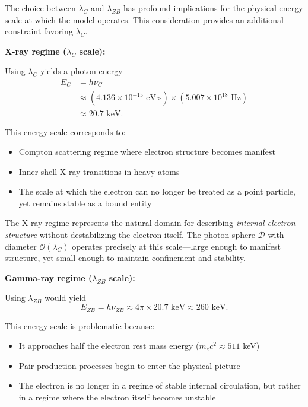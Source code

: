 \documentclass[%
 reprint,
 amsmath,amssymb,
 aps,
 prb,
]{revtex4-2}
\numberwithin{equation}{section}
\begin{document}
The choice between $\lambda_C$ and $\lambda_{ZB}$ has profound implications for the physical energy scale at which the model operates. This consideration provides an additional constraint favoring $\lambda_C$.

\vspace{0.5cm}

\noindent\textbf{X-ray regime ($\lambda_C$ scale):}

\vspace{0.3cm}

Using $\lambda_C$ yields a photon energy
\begin{equation}
\begin{split}
E_C &= h\nu_C  \\
    &\approx (4.136 \times 10^{-15} \text{ eV·s}) \times (5.007 \times 10^{18} \text{ Hz}) \\
    &\approx 20.7 \text{ keV}.
\end{split}
\end{equation}

This energy scale corresponds to:
\begin{itemize}
\item Compton scattering regime where electron structure becomes manifest
\item Inner-shell X-ray transitions in heavy atoms
\item The scale at which the electron can no longer be treated as a point particle, yet remains stable as a bound entity
\end{itemize}

The X-ray regime represents the natural domain for describing \textit{internal electron structure} without destabilizing the electron itself. The photon sphere $\mathcal{D}$ with diameter $\mathcal{O}(\lambda_C)$ operates precisely at this scale—large enough to manifest structure, yet small enough to maintain confinement and stability.

\vspace{1.5cm}

\noindent\textbf{Gamma-ray regime ($\lambda_{ZB}$ scale):}

\vspace{0.3cm}

Using $\lambda_{ZB}$ would yield
\begin{equation}
E_{ZB} = h\nu_{ZB} \approx 4\pi \times 20.7 \text{ keV} \approx 260 \text{ keV}.
\end{equation}

This energy scale is problematic because:
\begin{itemize}
\item It approaches half the electron rest mass energy ($m_e c^2 \approx 511$ keV)
\item Pair production processes begin to enter the physical picture
\item The electron is no longer in a regime of stable internal circulation, but rather in a regime where the electron itself becomes unstable
\end{itemize}
\end{document}
